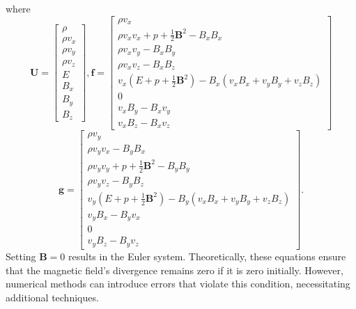 where
\[
\mathbf{U} = \begin{bmatrix}
\rho \\
\rho v_x \\
\rho v_y \\
\rho v_z \\
E \\
B_x \\
B_y \\
B_z 
\end{bmatrix},
\mathbf{f} = \begin{bmatrix}
\rho v_x \\
\rho v_x v_x+p+\frac{1}{2}\mathbf{B}^2-B_x B_x \\
\rho v_x v_y-B_x B_y \\
\rho v_x v_z-B_x B_z \\
v_x(E+p+\frac{1}{2}\mathbf{B}^2)-B_x (v_x B_x + v_y B_y+ v_z B_z) \\
0 \\
v_x B_y-B_x v_y \\
v_x B_z-B_x v_z
\end{bmatrix}\]
\[
\mathbf{g} = \begin{bmatrix}
\rho v_y \\
\rho v_y v_x-B_y B_x \\
\rho v_y v_y+p+\frac{1}{2}\mathbf{B}^2-B_y B_y\\
\rho v_y v_z-B_y B_z \\
v_y(E+p+\frac{1}{2}\mathbf{B}^2)-B_y (v_x B_x + v_y B_y+ v_z B_z) \\
v_y B_x-B_y v_x \\
0 \\
v_y B_z-B_y v_z
\end{bmatrix}
.\]
Setting $\mathbf{B}=0$ results in the Euler system. Theoretically, these equations ensure that the magnetic field's divergence remains zero if it is zero initially. However, numerical methods can introduce errors that violate this condition, necessitating additional techniques.
